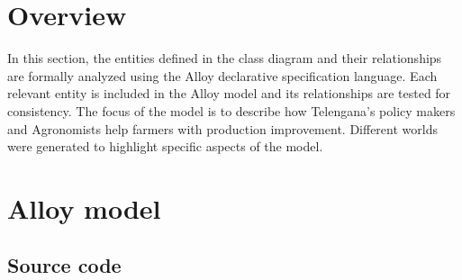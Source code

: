 \documentclass[../../main.tex]{subfiles}
\begin{document}
\section{Overview}

In this section, the entities defined in the class diagram and their relationships are formally analyzed using the Alloy declarative specification language. 
Each relevant entity is included in the Alloy model and its relationships are tested for consistency. The focus of the model is to describe how Telengana's policy makers and Agronomists help farmers with production improvement. Different worlds were generated to highlight specific aspects of the model.

\section{Alloy model}

\subsection{Source code}
\end{document}
